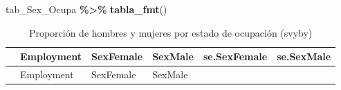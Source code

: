 \documentclass[
  spanish,
  12pt,
]{book}
\newenvironment{Shaded}{\begin{snugshade}}{\end{snugshade}}
\newcommand{\FunctionTok}[1]{\textcolor[rgb]{0.13,0.29,0.53}{\textbf{#1}}}
\newcommand{\NormalTok}[1]{#1}
\newcommand{\SpecialCharTok}[1]{\textcolor[rgb]{0.81,0.36,0.00}{\textbf{#1}}}
\begin{document}
\begin{Shaded}
\begin{Highlighting}[]
\NormalTok{tab\_Sex\_Ocupa }\SpecialCharTok{\%\textgreater{}\%}
  \FunctionTok{tabla\_fmt}\NormalTok{()}
\end{Highlighting}
\end{Shaded}

\begin{longtable}[]{@{}
  >{\raggedright\arraybackslash}p{}
  >{\raggedright\arraybackslash}p{}
  >{\centering\arraybackslash}p{}
  >{\centering\arraybackslash}p{}
  >{\centering\arraybackslash}p{}
  >{\centering\arraybackslash}p{}@{}}
\caption{\label{tab:tab-svyby-empleo-sexo}Proporción de hombres y mujeres por estado de ocupación (svyby)}\tabularnewline
\toprule\noalign{}
\begin{minipage}[b]{\linewidth}\raggedright
\end{minipage} & \begin{minipage}[b]{\linewidth}\raggedright
Employment
\end{minipage} & \begin{minipage}[b]{\linewidth}\centering
SexFemale
\end{minipage} & \begin{minipage}[b]{\linewidth}\centering
SexMale
\end{minipage} & \begin{minipage}[b]{\linewidth}\centering
se.SexFemale
\end{minipage} & \begin{minipage}[b]{\linewidth}\centering
se.SexMale
\end{minipage} \\
\midrule\noalign{}
\endfirsthead
\toprule\noalign{}
\begin{minipage}[b]{\linewidth}\raggedright
\end{minipage} & \begin{minipage}[b]{\linewidth}\raggedright
Employment
\end{minipage} & \begin{minipage}[b]{\linewidth}\centering
SexFemale
\end{minipage} & \begin{minipage}[b]{\linewidth}\centering
SexMale
\end{minipage} & \begin{minipage}[b]{\linewidth}\centering

\end{minipage}
\end{longtable}
\end{document}
